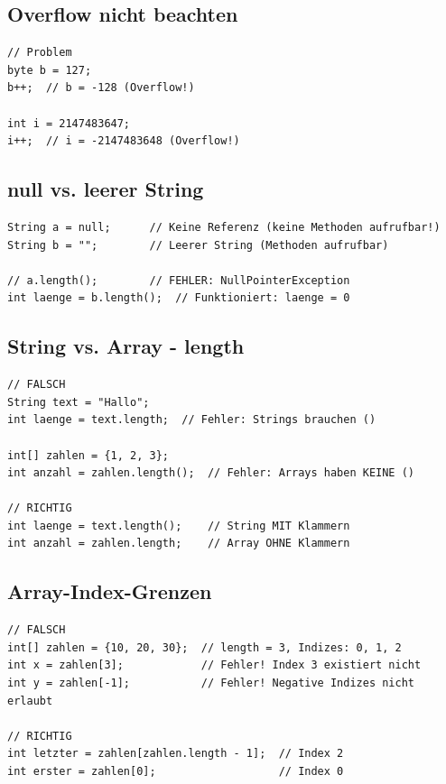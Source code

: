 \subsection*{Overflow nicht beachten}

\begin{lstlisting}
// Problem
byte b = 127;
b++;  // b = -128 (Overflow!)

int i = 2147483647;
i++;  // i = -2147483648 (Overflow!)
\end{lstlisting}

\subsection*{null vs. leerer String}

\begin{lstlisting}
String a = null;      // Keine Referenz (keine Methoden aufrufbar!)
String b = "";        // Leerer String (Methoden aufrufbar)

// a.length();        // FEHLER: NullPointerException
int laenge = b.length();  // Funktioniert: laenge = 0
\end{lstlisting}

\subsection*{String vs. Array - length}

\begin{lstlisting}
// FALSCH
String text = "Hallo";
int laenge = text.length;  // Fehler: Strings brauchen ()

int[] zahlen = {1, 2, 3};
int anzahl = zahlen.length();  // Fehler: Arrays haben KEINE ()

// RICHTIG
int laenge = text.length();    // String MIT Klammern
int anzahl = zahlen.length;    // Array OHNE Klammern
\end{lstlisting}

\subsection*{Array-Index-Grenzen}

\begin{lstlisting}
// FALSCH
int[] zahlen = {10, 20, 30};  // length = 3, Indizes: 0, 1, 2
int x = zahlen[3];            // Fehler! Index 3 existiert nicht
int y = zahlen[-1];           // Fehler! Negative Indizes nicht erlaubt

// RICHTIG
int letzter = zahlen[zahlen.length - 1];  // Index 2
int erster = zahlen[0];                   // Index 0
\end{lstlisting}

